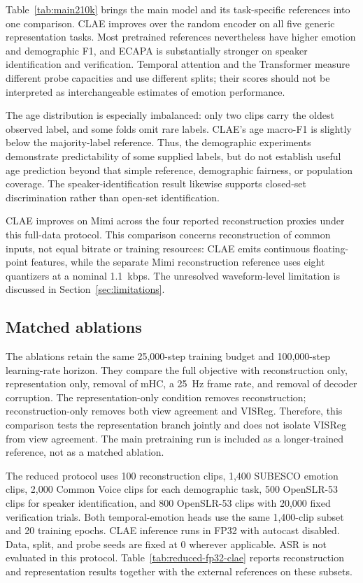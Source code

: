\documentclass[11pt,a4paper]{article}
\begin{document}
Table~\ref{tab:main210k} brings the main model and its task-specific references into one comparison. CLAE improves over the random encoder on all five generic representation tasks. Most pretrained references nevertheless have higher emotion and demographic F1, and ECAPA is substantially stronger on speaker identification and verification. Temporal attention and the Transformer measure different probe capacities and use different splits; their scores should not be interpreted as interchangeable estimates of emotion performance.

The age distribution is especially imbalanced: only two clips carry the oldest observed label, and some folds omit rare labels. CLAE's age macro-F1 is slightly below the majority-label reference. Thus, the demographic experiments demonstrate predictability of some supplied labels, but do not establish useful age prediction beyond that simple reference, demographic fairness, or population coverage. The speaker-identification result likewise supports closed-set discrimination rather than open-set identification.

CLAE improves on Mimi across the four reported reconstruction proxies under this full-data protocol. This comparison concerns reconstruction of common inputs, not equal bitrate or training resources: CLAE emits continuous floating-point features, while the separate Mimi reconstruction reference uses eight quantizers at a nominal 1.1~kbps. The unresolved waveform-level limitation is discussed in Section~\ref{sec:limitations}.

\subsection{Matched ablations}
\label{sec:ablation}
\label{sec:reduced-fp32}

The ablations retain the same 25,000-step training budget and 100,000-step learning-rate horizon. They compare the full objective with reconstruction only, representation only, removal of mHC, a 25~Hz frame rate, and removal of decoder corruption. The representation-only condition removes reconstruction; reconstruction-only removes both view agreement and VISReg. Therefore, this comparison tests the representation branch jointly and does not isolate VISReg from view agreement. The main pretraining run is included as a longer-trained reference, not as a matched ablation.

The reduced protocol uses 100 reconstruction clips, 1,400 SUBESCO emotion clips, 2,000 Common Voice clips for each demographic task, 500 OpenSLR-53 clips for speaker identification, and 800 OpenSLR-53 clips with 20,000 fixed verification trials. Both temporal-emotion heads use the same 1,400-clip subset and 20 training epochs. CLAE inference runs in FP32 with autocast disabled. Data, split, and probe seeds are fixed at 0 wherever applicable. ASR is not evaluated in this protocol. Table~\ref{tab:reduced-fp32-clae} reports reconstruction and representation results together with the external references on these subsets.
\end{document}
